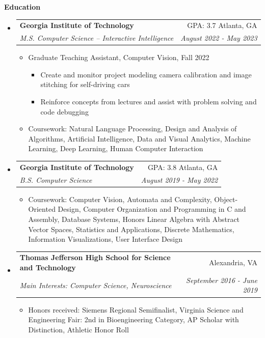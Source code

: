 \documentclass[letterpaper,11pt]{article}
\makeatletter
\newcommand{\resitem}[1]{\item #1 \vspace{-2pt}}
\newcommand{\resheading}[1]{{\large \colorbox{mygrey}{\begin{minipage}{\textwidth}{\textbf{#1 \vphantom{p\^{E}}}}\end{minipage}}}}
\newcommand{\ressubheading}[4]{
\begin{tabular*}{7.0in}{l@{\extracolsep{\fill}}r}
		\textbf{#1} & #2 \\
		\textit{#3} & \textit{#4} \\
\end{tabular*}\vspace{-6pt}}
\makeatother
\begin{document}
\resheading{Education}
\begin{itemize}\item[]
    \ressubheading{Georgia Institute of Technology}{GPA: 3.7 \hspace{1em} Atlanta, GA}{M.S. Computer Science -- Interactive Intelligence}{August 2022 - May 2023}
        \begin{itemize}
            \resitem{Graduate Teaching Assistant, Computer Vision, Fall 2022}
            \begin{itemize}
                \resitem{Create and monitor project modeling camera calibration and image stitching for self-driving cars}
                \resitem{Reinforce concepts from lectures and assist with problem solving and code debugging}
            \end{itemize}
            \resitem{Coursework: Natural Language Processing, Design and Analysis of Algorithms, Artificial Intelligence, Data and Visual Analytics, Machine Learning, Deep Learning, Human Computer Interaction}
        \end{itemize}
\item[]  %
    \ressubheading{Georgia Institute of Technology}{GPA: 3.8 \hspace{1em} Atlanta, GA}{B.S. Computer Science}{August 2019 - May 2022}
	\begin{itemize}
            \resitem{Coursework: Computer Vision, Automata and Complexity, Object-Oriented Design, Computer Organization and Programming in C and Assembly, Database Systems, Honors Linear Algebra with Abstract Vector Spaces, Statistics and Applications, Discrete Mathematics, Information Visualizations, User Interface Design}
	\end{itemize}
\item[]
    \ressubheading{Thomas Jefferson High School for Science and Technology}{Alexandria, VA}{Main Interests: Computer Science, Neuroscience}{September 2016 - June 2019}
	\begin{itemize}
        \resitem{Honors received: Siemens Regional Semifinalist, Virginia Science and Engineering Fair: 2nd in Bioengineering Category, AP Scholar with Distinction, Athletic Honor Roll}
	\end{itemize}
\end{itemize}
\end{document}
